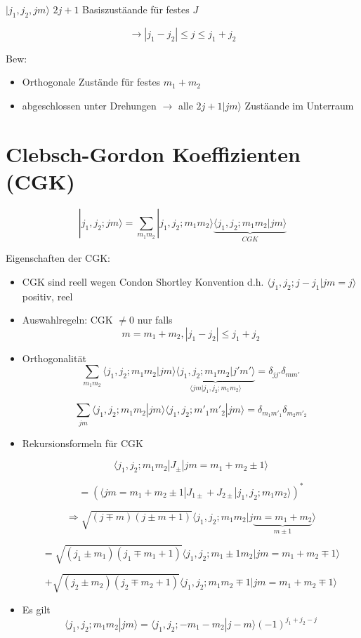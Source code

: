 \(|j_1,j_2,jm\rangle\) \(2j+1\) Basiszustäande für festes \(J\)

\[ \rightarrow |j_1-j_2| \leq j \leq j_1+j_2 \]

Bew:
\begin{itemize}
\item Orthogonale Zustände für festes \(m_1+m_2\)
\item abgeschlossen unter Drehungen \(\rightarrow\) alle
  \(2j+1|jm\rangle\) Zustäande im Unterraum
\end{itemize}


\section{Clebsch-Gordon Koeffizienten (CGK)}

\[|j_1,j_2;jm\rangle=\sum_{m_1m_2}|j_1,j_2;m_1m_2\rangle\underbrace{\langle j_1,j_2;m_1m_2|jm\rangle}_{CGK}\]

Eigenschaften der CGK:
\begin{itemize}
\item CGK sind reell wegen Condon Shortley Konvention
d.h.  \(\langle j_1,j_2;j-j_1|jm=j\rangle\) positiv, reel
\item Auswahlregeln: CGK \(\neq 0\) nur falls 
\[ m=m_1+m_2, |j_1-j_2|\leq j_1+j_2\]
\item Orthogonalität
\[ \sum_{m_1m_2}\langle  j_1,j_2;m_1m_2|jm\rangle \underbrace{\langle  j_1,j_2;m_1m_2|j'm'\rangle}_{\langle jm|j_1,j_2;m_1m_2\rangle} = \delta_{jj'} \delta_{mm'}\]

\[ \sum_{jm}\langle  j_1,j_2;m_1m_2|jm\rangle \langle j_1,j_2;m'_1m'_2|jm\rangle = \delta_{m_1m'_1} \delta_{m_2m'_2}\]

\item Rekursionsformeln für CGK

\[ \langle  j_1,j_2;m_1m_2|J_{\pm}|jm=m_1+m_2\pm 1\rangle\]

\[= (\langle jm=m_1+m_2\pm 1 |J_{1\pm}+J_{2\pm}|j_1,j_2;m_1m_2\rangle)^*\]

\[\Rightarrow \sqrt{(j\mp m)(j\pm m+1)} \langle  j_1,j_2;m_1m_2|j\underbrace{m=m_1+m_2}_{m\pm 1} \rangle\]

\[ =  \sqrt{(j_1\pm m_1)(j_1\mp m_1+1)} \langle  j_1,j_2;m_1\pm 1 m_2|jm=m_1+m_2\mp 1 \rangle \]

\[ +  \sqrt{(j_2\pm m_2)(j_2\mp m_2+1)} \langle  j_1,j_2;m_1 m_2\mp 1|jm=m_1+m_2\mp 1 \rangle \]

\item Es gilt 
\[ \langle  j_1,j_2;m_1m_2|jm \rangle = \langle  j_1,j_2;-m_1-m_2|j-m\rangle (-1)^{j_1+j_2-j} \]

\end{itemize}

